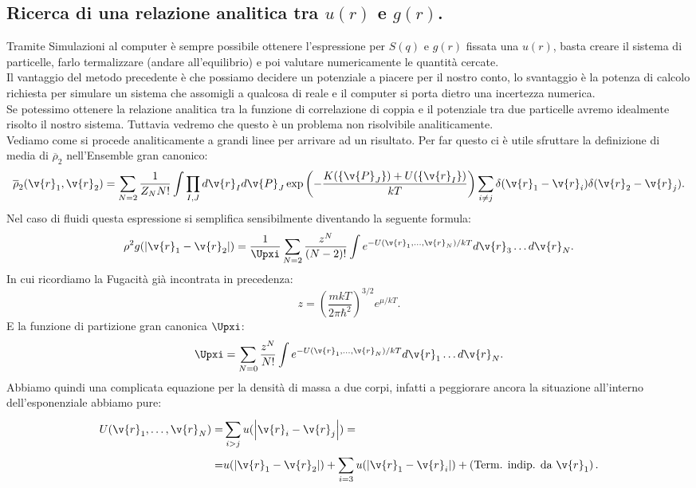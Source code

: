 \subsection{Ricerca di una relazione analitica tra $u(r)$ e $g(r)$.}
\label{subsec:Ricerca di una relazione analitica tra $u(r)$ e $g(r)$.}
Tramite Simulazioni al computer è sempre possibile ottenere l'espressione per $S(q)$ e $g(r)$ fissata una $u(r)$, basta creare il sistema di particelle, farlo termalizzare (andare all'equilibrio) e poi valutare numericamente le quantità cercate. \\
Il vantaggio del metodo precedente è che possiamo decidere un potenziale a piacere per il nostro conto, lo svantaggio è la potenza di calcolo richiesta per simulare un sistema che assomigli a qualcosa di reale e il computer si porta dietro una incertezza numerica.\\
Se potessimo ottenere la relazione analitica tra la funzione di correlazione di coppia e il potenziale tra due particelle avremo idealmente risolto il nostro sistema. Tuttavia vedremo che questo è un problema non risolvibile analiticamente.\\
Vediamo come si procede analiticamente a grandi linee per arrivare ad un risultato. Per far questo ci è utile sfruttare la definizione di media di $\overline{\rho }_2$ nell'Ensemble gran canonico:
\[
	\overline{\rho }_2(\v{r}_1,\v{r}_2) =
	\sum_{N=2}^{} \frac{1}{Z_N N!}\int \prod_{I,J}^{} d \v{r}_I d \v{P}_J 
	\exp\left(
	-\frac{ K(\left\{ \v{P}_J \right\}) + U(\left\{ \v{r}_I \right\} ) }{kT} \right)
	\sum_{i\neq j}^{} \delta(\v{r}_1-\v{r}_i)\delta(\v{r}_2-\v{r}_j)
.\] 
Nel caso di fluidi questa espressione si semplifica sensibilmente diventando la seguente formula:
\[
	\rho ^2g(\left| \v{r}_1-\v{r}_2 \right|)
	=
	\frac{1}{\Upxi}
	\sum_{N=2}^{} \frac{z^{N}}{(N-2)!}
	\int e^{-U(\v{r}_1,\ldots,\v{r}_N)/kT} d \v{r}_3\ldots d \v{r}_N
	\label{eq:brutta-eq}
.\] 
In cui ricordiamo la Fugacità già incontrata in precedenza:
\[
	z = \left( \frac{mkT}{2\pi\hbar ^2} \right) ^{3/2}e^{\mu /kT}
.\] 
E la funzione di partizione gran canonica $\Upxi$:
\[
	\Upxi = 
	\sum_{N=0}^{} \frac{z^{N}}{N!}\int e^{-U(\v{r}_1,\ldots,\v{r}_N)/kT}
	d \v{r}_1\ldots d \v{r}_N
.\] 
Abbiamo quindi una complicata equazione per la densità di massa a due corpi, infatti a peggiorare ancora la situazione all'interno dell'esponenziale abbiamo pure:
\[\begin{aligned}
	U(\v{r}_1,\ldots,\v{r}_N) =&
	\sum_{i>j}^{} u(\left| \v{r}_i - \v{r}_j \right| )=\\
	=&
	u(\left| \v{r}_1-\v{r}_2 \right| ) 
	+
	\sum_{i=3}^{} u(\left| \v{r}_1-\v{r}_i \right| ) 
	+
	\left( \text{Term. indip. da } \v{r}_1 \right) 
.\end{aligned}\]
